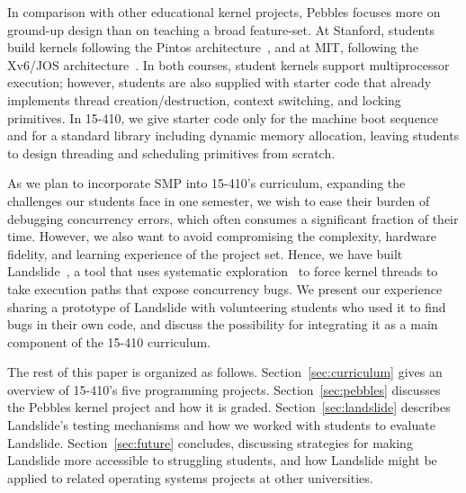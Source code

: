 In comparison with other educational kernel projects,
Pebbles focuses more on ground-up design than on teaching a broad feature-set.
At Stanford, students build kernels following the Pintos architecture~\cite{pintos}, and at MIT, following the Xv6/JOS architecture~\cite{xv6}.
In both courses, student kernels support multiprocessor execution;
however, students are also supplied with starter code that already implements thread creation/destruction, context switching, and locking primitives.
In 15-410, we give starter code only for the machine boot sequence and for a standard library including dynamic memory allocation, leaving students to design threading and scheduling primitives from scratch.

As we plan to incorporate SMP into 15-410's curriculum, expanding the challenges our students face in one semester,
we wish to ease their burden of debugging concurrency errors, which often consumes a significant fraction of their time.
However, we also want to avoid compromising the complexity, hardware fidelity, and learning experience of the project set.
Hence, we have built Landslide~\cite{landslide}, a tool that uses systematic exploration~\cite{verisoft} to force kernel threads to take execution paths that expose concurrency bugs.
We present our experience sharing a prototype of Landslide with volunteering students who used it to find bugs in their own code, and discuss the possibility for integrating it as a main component of the 15-410 curriculum.


The rest of this paper is organized as follows.
Section~\ref{sec:curriculum} gives an overview of 15-410's five programming projects.
Section~\ref{sec:pebbles} discusses the Pebbles kernel project and how it is graded.
Section~\ref{sec:landslide} describes Landslide's testing mechanisms and how we worked with students to evaluate Landslide.
Section~\ref{sec:future} concludes, discussing strategies for making Landslide more accessible to struggling students, and how Landslide might be applied to related operating systems projects at other universities.
